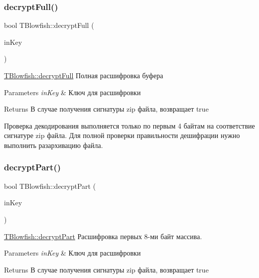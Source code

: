 \subsubsection{\texorpdfstring{decrypt\+Full()}{decryptFull()}}
{\footnotesize\ttfamily bool T\+Blowfish\+::decrypt\+Full (\begin{DoxyParamCaption}\item[{Q\+String}]{in\+Key }\end{DoxyParamCaption})}



\hyperlink{classunit_test_1_1_t_blowfish_aa6cf535926e4a3daae058725a6192619}{T\+Blowfish\+::decrypt\+Full} Полная расшифровка буфера 


\begin{DoxyParams}{Parameters}
{\em in\+Key} & Ключ для расшифровки \\
\hline
\end{DoxyParams}
\begin{DoxyReturn}{Returns}
В случае получения сигнатуры zip файла, возвращает true
\end{DoxyReturn}
Проверка декодирования выполняется только по первым 4 байтам на соответствие сигнатуре zip файла. Для полной проверки правильности дешифрации нужно выполнить разархивацию файла. \mbox{\label{classunit_test_1_1_t_blowfish_a5bb77f2618aa5dd97b86d842e546fdae}} 
\subsubsection{\texorpdfstring{decrypt\+Part()}{decryptPart()}}
{\footnotesize\ttfamily bool T\+Blowfish\+::decrypt\+Part (\begin{DoxyParamCaption}\item[{Q\+String}]{in\+Key }\end{DoxyParamCaption})}



\hyperlink{classunit_test_1_1_t_blowfish_a5bb77f2618aa5dd97b86d842e546fdae}{T\+Blowfish\+::decrypt\+Part} Расшифровка первых 8-\/ми байт массива. 


\begin{DoxyParams}{Parameters}
{\em in\+Key} & Ключ для расшифровки \\
\hline
\end{DoxyParams}
\begin{DoxyReturn}{Returns}
В случае получения сигнатуры zip файла, возвращает true 
\end{DoxyReturn}
\mbox{\label{classunit_test_1_1_t_blowfish_ab1f9fc3cc9b075c3b9b558b5719c159e}} 
